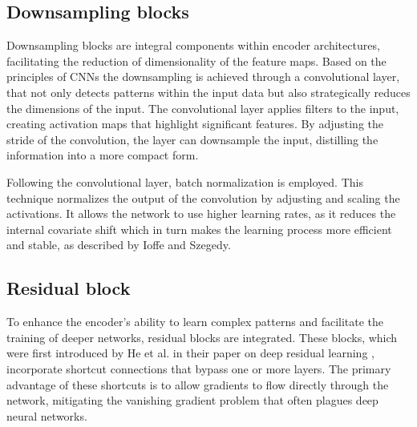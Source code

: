 \subsection{Downsampling blocks}
Downsampling blocks are integral components within encoder architectures, facilitating the reduction of dimensionality of the feature maps. Based on the principles of CNNs the downsampling is achieved through a convolutional layer, that not only detects patterns within the input data but also strategically reduces the dimensions of the input.
The convolutional layer applies filters to the input, creating activation maps that highlight significant features. By adjusting the stride of the convolution, the layer can downsample the input, distilling the information into a more compact form. 

Following the convolutional layer, batch normalization is employed. This technique normalizes the output of the convolution by adjusting and scaling the activations. It allows the network to use higher learning rates, as it reduces the internal covariate shift which in turn makes the learning process more efficient and stable, as described by Ioffe and Szegedy\cite{batchnorm}.

\subsection{Residual block}
To enhance the encoder's ability to learn complex patterns and facilitate the training of deeper networks, residual blocks are integrated. These blocks, which were first introduced by He et al. in their paper on deep residual learning \cite{ResLearn}, incorporate shortcut connections that bypass one or more layers. 
The primary advantage of these shortcuts is to allow gradients to flow directly through the network, mitigating the vanishing gradient problem that often plagues deep neural networks. 

